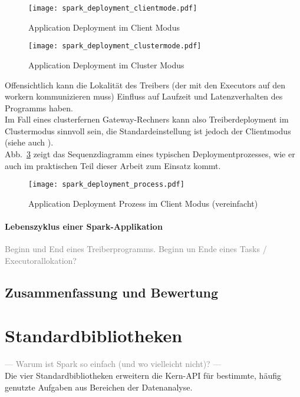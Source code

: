 \begin{figure}[ht!]
	\centering
  \texttt{[image: spark\_deployment\_clientmode.pdf]}
	\caption{Application Deployment im Client Modus}
	\label{fig:spark_deployment_clientmode}
\end{figure}

\begin{figure}[ht!]
	\centering
  \texttt{[image: spark\_deployment\_clustermode.pdf]}
	\caption{Application Deployment im Cluster Modus}
	\label{fig:spark_deployment_clustermode}
\end{figure}

Offensichtlich kann die Lokalität des Treibers (der mit den Executors auf den \gls{worker}n kommunizieren muss) Einfluss auf Laufzeit und Latenzverhalten des Programms haben.\\

Im Fall eines clusterfernen Gateway-Rechners kann also Treiberdeployment im Clustermodus sinnvoll sein, die Standardeinstellung ist jedoch der Clientmodus (siehe auch \cite{spark_submission}).\\

Abb.~\ref{fig:app_deployment_process} zeigt das Sequenzdiagramm eines typischen Deploymentprozesses, wie er auch im praktischen Teil dieser Arbeit zum Einsatz kommt.

\begin{figure}[ht!]
	\centering
  \texttt{[image: spark\_deployment\_process.pdf]}
	\caption{Application Deployment Prozess im Client Modus (vereinfacht)}
	\label{fig:app_deployment_process}
\end{figure}

\paragraph{Lebenszyklus einer Spark-Applikation}

\textcolor{gray}{Beginn und End eines Treiberprogramms. Beginn un Ende eines Tasks / Executorallokation?}\\

\subsection{Zusammenfassung und Bewertung}

\section{Standardbibliotheken}
\textcolor{gray}{--- Warum ist Spark so einfach (und wo vielleicht nicht)? ---}\\
Die vier Standardbibliotheken erweitern die Kern-API für bestimmte, häufig genutzte Aufgaben aus Bereichen der Datenanalyse.\\

